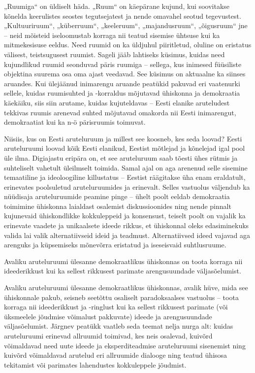 \documentclass[estonian,]{article}
\begin{document}
„Ruumiga`` on üldiselt häda. „Ruum`` on käepärane kujund, kui soovitakse kõnelda keerulistes seostes tegutsejatest ja nende omavahel seotud tegevustest. „Kultuuriruum``, „küberruum``, „keeleruum``, „majandusruum``, „õigusruum`` jne -- neid mõisteid iseloomustab korraga nii teatud sisemise ühtsuse kui ka mitmekesisuse eeldus. Need ruumid on ka üldjuhul piiritletud, oluline on eristatus välisest, teistsugusest ruumist. Sageli jääb lahtiseks küsimus, kuidas need kujundlikud ruumid seonduvad päris ruumiga -- sellega, kus inimesed füüsiliste objektina suurema osa oma ajast veedavad. See küsimus on aktuaalne ka siinses aruandes. Kui ülejäänud inimarengu aruande peatükid pakuvad eri vaatenurki sellele, kuidas ruumisuhted ja -korraldus mõjutavad ühiskonna ja demokraatia käekäiku, siis siin arutame, kuidas kujuteldavas -- Eesti elanike aruteludest tekkivas ruumis arenevad suhted mõjutavad omakorda nii Eesti inimarengut, demokraatiat kui ka n-ö pärisruumis toimuvat.

Niisiis, kus on Eesti aruteluruum ja millest see koosneb, kes seda loovad? Eesti aruteluruumi loovad kõik Eesti elanikud, Eestist mõtlejad ja kõnelejad igal pool üle ilma. Digiajastu eripära on, et see aruteluruum saab tõesti ühes rütmis ja suhteliselt vahetult üleilmselt toimida. Samal ajal on aga arenenud selle sisemine temaatiline ja ideoloogiline killustatus -- Eestist räägitakse üha enam eraldatult, erinevates poolsuletud aruteluruumides ja erinevalt. Selles vastuolus väljendub ka nüüdisaja aruteluruumide peamine pinge -- ühelt poolt eeldab demokraatia toimimine ühiskonna laialdast osalemist diskussioonides ning nende pinnalt kujunevaid ühiskondlikke kokkuleppeid ja konsensust, teiselt poolt on vajalik ka erinevate vaadete ja unikaalsete ideede rikkus, et ühiskonnal oleks edasiminekuks valida lai valik alternatiivseid ideid ja teadmust. Alternatiivsed ideed vajavad aga arenguks ja küpsemiseks mõnevõrra eristatud ja iseseisvaid suhtlusruume.

\begin{blockquote-left}
Avaliku aruteluruumi ülesanne demokraatlikus ühiskonnas on toota korraga
nii ideederikkust kui ka sellest rikkusest parimate arengusuundade
väljasõelumist.
\end{blockquote-left}

Avaliku aruteluruumi ülesanne demokraatlikus ühiskonnas, avalik hüve, mida see ühiskonnale pakub, seisneb seetõttu osaliselt paradoksaalses vastuolus -- toota korraga nii ideederikkust ja -ringlust kui ka sellest rikkusest parimate (või üksmeelele jõudmise võimalust pakkuvate) ideede ja arengusuundade väljasõelumist. Järgnev peatükk vaatleb seda teemat nelja nurga alt: kuidas aruteluruumi erinevad allruumid toimivad, kes neis osalevad, kuivõrd võimaldavad need uute ideede ja eksperditeadmise aruteluruumi sisenemist ning kuivõrd võimaldavad arutelud eri allruumide dialooge ning teatud ühisosa tekitamist või parimates lahendustes kokkuleppele jõudmist.
\end{document}
